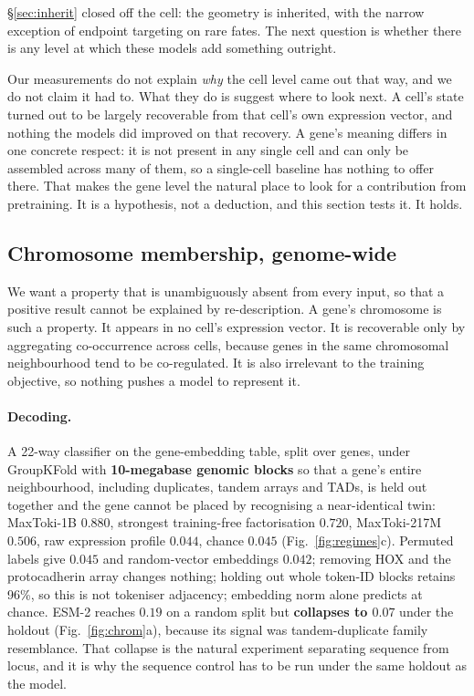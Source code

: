 \documentclass[11pt]{article}
\begin{document}
\S\ref{sec:inherit} closed off the cell: the geometry is inherited, with the narrow exception of
endpoint targeting on rare fates. The next question is whether there is any level at which these models
add something outright.

Our measurements do not explain \emph{why} the cell level came out that way, and we do not claim it had
to. What they do is suggest where to look next. A cell's state turned out to be largely recoverable
from that cell's own expression vector, and nothing the models did improved on that recovery. A gene's
meaning differs in one concrete respect: it is not present in any single cell and can only be assembled
across many of them, so a single-cell baseline has nothing to offer there. That makes the gene level
the natural place to look for a contribution from pretraining. It is a hypothesis, not a deduction, and
this section tests it. It holds.

\subsection{Chromosome membership, genome-wide}
We want a property that is unambiguously absent from every input, so that a positive result cannot be
explained by re-description. A gene's chromosome is such a property. It appears in no cell's expression
vector. It is recoverable only by aggregating co-occurrence across cells, because genes in the same
chromosomal neighbourhood tend to be co-regulated. It is also irrelevant to the training objective, so
nothing pushes a model to represent it.

\paragraph{Decoding.} A 22-way classifier on the gene-embedding table, split over genes, under
GroupKFold with \textbf{10-megabase genomic blocks} so that a gene's entire neighbourhood, including
duplicates, tandem arrays and TADs, is held out together and the gene cannot be placed by recognising a
near-identical twin: MaxToki-1B $\mathbf{0.880}$, strongest training-free factorisation $0.720$,
MaxToki-217M $0.506$, raw expression profile $0.044$, chance $0.045$ (Fig.~\ref{fig:regimes}c).
Permuted labels give $0.045$ and random-vector embeddings $0.042$; removing HOX and the protocadherin
array changes nothing; holding out whole token-ID blocks retains 96\%, so this is not tokeniser
adjacency; embedding norm alone predicts at chance. ESM-2 reaches $0.19$ on a random split but
\textbf{collapses to $0.07$} under the holdout (Fig.~\ref{fig:chrom}a), because its signal was
tandem-duplicate family resemblance. That collapse is the natural experiment separating sequence from
locus, and it is why the sequence control has to be run under the same holdout as the model.
\end{document}

